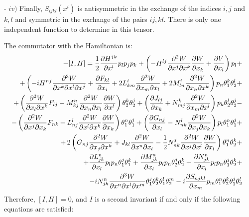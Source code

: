 \documentclass[a4paper,11pt,twoside]{article}
\begin{document}
\noindent - $iv)$ Finally, $S_{ijkl}(x^i)$ is antisymmetric in the exchange of the indices $i,j$ and $k,l$ and symmetric in the exchange of the pairs $ij,kl$. There is only one independent function to determine in this tensor.

\vspace*{0.1cm}

\noindent The commutator with the Hamiltonian is:
\begin{eqnarray*}
& & \hspace{-0.6cm}  -[I,H] = {\displaystyle  \frac{1}{2} \frac{\partial H^{jk}}{\partial x^l} p_l
p_j p_k +\left( -H^{lj} \frac{\partial^2 W}{\partial
x^j\partial x^k} \frac{\partial W}{\partial x_k}+\frac{\partial
V}{\partial x_l} \right) p_l +}
\\
& & \hspace{-0.6cm} {\displaystyle + \left(-i H^{nj}\frac{\partial^3 W}{\partial x^k\partial x^l\partial x^j}+ \frac{\partial F_{kl}}{\partial x_i}+2
L_{km}^i\frac{\partial^2 W}{\partial x_m\partial x_l}+2  M_{ln}^i
\frac{\partial^2 W}{\partial x_n\partial x^k} \right) p_n
\theta_1^k \theta_2^l+} \\
& & \hspace{-0.6cm} {\displaystyle  + \left(\frac{\partial^2
W}{\partial x_l \partial x^k} F_{lj}- M^n_{kj}
\frac{\partial^2 W}{\partial x_n\partial x_l}\frac{\partial
W}{\partial x^l} \right) \theta_2^k \theta_2^j +\left( \frac{\partial J_{lj}}{\partial
x_k}+N^k_{mj} \frac{\partial^2 W}{\partial x_m\partial x^l}
\right) p_k \theta_2^l \theta_2^j-}\\
& & \hspace{-0.6cm} {\displaystyle -
\left(\frac{\partial^2 W}{\partial x^j\partial x_k}
F_{nk}+ L^l_{nj} \frac{\partial^2 W }{\partial
x^l\partial x^k}\frac{\partial W}{\partial x_k} \right) \theta_1^n
\theta_1^j+ \left( \frac{\partial G_{nj}}{\partial
x_l}-N^l_{nk}\frac{\partial^2 W}{\partial x_j\partial x_k} \right)
p_l \theta_1^n \theta_1^j+}
\\
& & \hspace{-0.6cm} {\displaystyle  +\, 2 \left( G_{nj}\frac{\partial^2 W}{\partial x_j\partial x^k}+ J_{kl}\frac{\partial^2 W}{\partial x^n\partial x_l}-\frac{1}{2}
N^j_{nk} \frac{\partial^2 W}{\partial x^j\partial
x^l}\frac{\partial W}{\partial x_l} \right) \theta_1^n \theta_2^k+}
\\
& & \hspace{-0.6cm} {\displaystyle + \frac{\partial L^n_{jk}}{\partial x_l} p_l p_n
\theta_1^j \theta_1^k+ \frac{\partial M^n_{jk}}{\partial x_l} p_l
p_n \theta_2^j \theta_2^k+ \frac{\partial N^n_{jk}}{\partial x_l}
p_l p_n \theta_1^j \theta_2^k+} \\
& & \hspace{-0.6cm} {\displaystyle -i N^n_{jk}\frac{\partial^3 W}{\partial x^n\partial x^l\partial
x^m} \theta_1^j \theta_2^k \theta_1^l \theta_2^m -i \frac{\partial
S_{njkl}}{\partial x_m} p_m \theta_1^n \theta_2^k \theta_1^j
\theta_2^l }
\end{eqnarray*}
\noindent Therefore, $[I,H]=0$, and $I$ is a second invariant if
and only if the following equations are satisfied:
\end{document}
